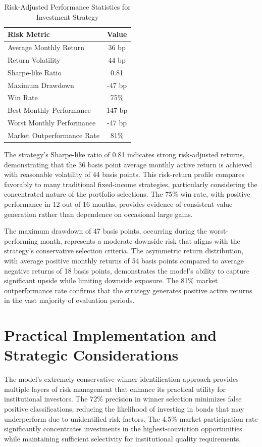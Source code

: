 \begin{table}[htbp]
\centering
\caption{Risk-Adjusted Performance Statistics for Investment Strategy}
\label{tab:risk_metrics}
\begin{tabular}{lc}
\hline
\textbf{Risk Metric} & \textbf{Value} \\
\hline
Average Monthly Return & 36 bp \\
Return Volatility & 44 bp \\
Sharpe-like Ratio & 0.81 \\
Maximum Drawdown & -47 bp \\
Win Rate & 75\% \\
Best Monthly Performance & 147 bp \\
Worst Monthly Performance & -47 bp \\
Market Outperformance Rate & 81\% \\
\hline
\end{tabular}
\end{table}

The strategy's Sharpe-like ratio of 0.81 indicates strong risk-adjusted returns, demonstrating that the 36 basis point average monthly active return is achieved with reasonable volatility of 44 basis points. This risk-return profile compares favorably to many traditional fixed-income strategies, particularly considering the concentrated nature of the portfolio selections. The 75\% win rate, with positive performance in 12 out of 16 months, provides evidence of consistent value generation rather than dependence on occasional large gains.

The maximum drawdown of 47 basis points, occurring during the worst-performing month, represents a moderate downside risk that aligns with the strategy's conservative selection criteria. The asymmetric return distribution, with average positive monthly returns of 54 basis points compared to average negative returns of 18 basis points, demonstrates the model's ability to capture significant upside while limiting downside exposure. The 81\% market outperformance rate confirms that the strategy generates positive active returns in the vast majority of evaluation periods.

\section{Practical Implementation and Strategic Considerations}

The model's extremely conservative winner identification approach provides multiple layers of risk management that enhance its practical utility for institutional investors. The 72\% precision in winner selection minimizes false positive classifications, reducing the likelihood of investing in bonds that may underperform due to unidentified risk factors. The 4.5\% market participation rate significantly concentrates investments in the highest-conviction opportunities while maintaining sufficient selectivity for institutional quality requirements.

